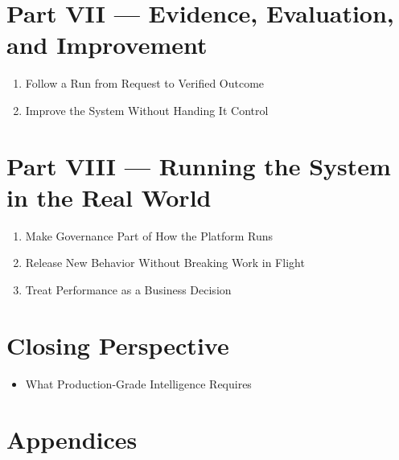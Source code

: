 \section{Part VII — Evidence, Evaluation, and Improvement}

\begin{enumerate}

\item Follow a Run from Request to Verified Outcome

\item Improve the System Without Handing It Control

\end{enumerate}

\section{Part VIII — Running the System in the Real World}

\begin{enumerate}

\item Make Governance Part of How the Platform Runs

\item Release New Behavior Without Breaking Work in Flight

\item Treat Performance as a Business Decision

\end{enumerate}

\section{Closing Perspective}

\begin{itemize}

\item What Production-Grade Intelligence Requires

\end{itemize}

\section{Appendices}

